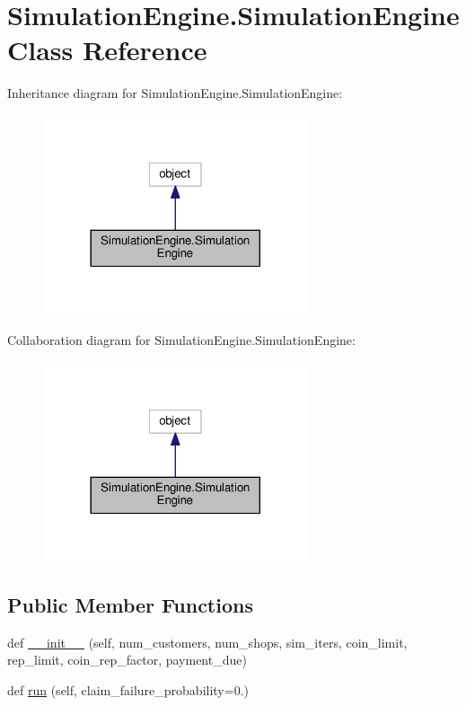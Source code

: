 \hypertarget{class_simulation_engine_1_1_simulation_engine}{}\section{Simulation\+Engine.\+Simulation\+Engine Class Reference}
\label{class_simulation_engine_1_1_simulation_engine}


Inheritance diagram for Simulation\+Engine.\+Simulation\+Engine\+:\nopagebreak
\begin{figure}[H]
\begin{center}
\leavevmode
\includegraphics[width=221pt]{class_simulation_engine_1_1_simulation_engine__inherit__graph}
\end{center}
\end{figure}


Collaboration diagram for Simulation\+Engine.\+Simulation\+Engine\+:\nopagebreak
\begin{figure}[H]
\begin{center}
\leavevmode
\includegraphics[width=221pt]{class_simulation_engine_1_1_simulation_engine__coll__graph}
\end{center}
\end{figure}
\subsection*{Public Member Functions}
\begin{DoxyCompactItemize}
\item 
def \mbox{\hyperlink{class_simulation_engine_1_1_simulation_engine_adc5d57358f9043ec19d957d6df7afa6e}{\+\_\+\+\_\+init\+\_\+\+\_\+}} (self, num\+\_\+customers, num\+\_\+shops, sim\+\_\+iters, coin\+\_\+limit, rep\+\_\+limit, coin\+\_\+rep\+\_\+factor, payment\+\_\+due)
\item 
def \mbox{\hyperlink{class_simulation_engine_1_1_simulation_engine_a3a741dc8da93469cd400bf8ff198de05}{run}} (self, claim\+\_\+failure\+\_\+probability=0.)
\end{DoxyCompactItemize}

